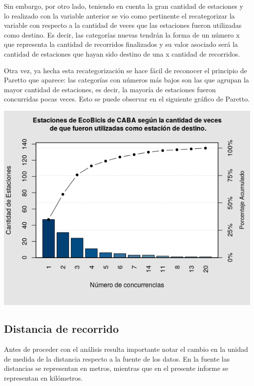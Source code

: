 \documentclass[11pt]{article}
\begin{document}
    
    Sin embargo, por otro lado, teniendo en cuenta la gran cantidad de estaciones y lo realizado con la variable anterior se vio como pertinente el recategorizar la variable 
    con respecto a la cantidad de veces que las estaciones fueron utilizadas como destino. Es decir, las categor\'ias nuevas tendr\'an la forma de un n\'umero x que representa 
    la cantidad de recorridos finalizados y su valor asociado ser\'a la cantidad de estaciones que hayan sido destino de una x cantidad de recorridos. 

    Otra vez, ya hecha esta recategorizaci\'on se hace f\'acil de reconocer el principio de Paretto que aparece: las categor\'ias con n\'umeros m\'as bajos son las que 
    agrupan la mayor cantidad de estaciones, es decir, la mayor\'ia de estaciones fueron concurridas pocas veces. Esto se puede observar en el siguiente gr\'afico de Paretto. 

    \begin{center}
      \includegraphics[scale=0.7]{ParettoDest.png}
    \end{center}

    \subsection{Distancia de recorrido}

    Antes de proceder con el an\'alisis resulta importante notar el cambio en la unidad 
    de medida de la distancia respecto a la fuente de los datos. En la fuente las distancias 
    se representan en metros, mientras que en el presente informe se representan en kil\'ometros. 
\end{document}
